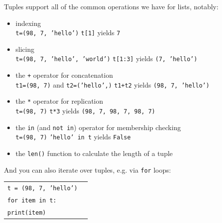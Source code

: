 \documentclass[t,handout,9pt]{beamer}
\begin{document}
\begin{frame}
\vfill
Tuples support all of the common operations we have for lists, notably:
\begin{itemize}
	\item indexing\\
	\quad\texttt{t=(98, 7, 'hello')} \qquad \texttt{t[1]} yields \texttt{7} \\
	\item slicing\\
	\quad\texttt{t=(98, 7, 'hello', 'world')} \qquad \texttt{t[1:3]} yields \texttt{(7, 'hello')} \\
	\item the \texttt{+} operator for concatenation\\
	\quad\texttt{t1=(98, 7)} and \texttt{t2=('hello',)} \qquad \texttt{t1+t2} yields \texttt{(98, 7, 'hello')} \\
	\item the \texttt{*} operator for replication\\
	\quad\texttt{t=(98, 7)} \qquad \texttt{t*3} yields \texttt{(98, 7, 98, 7, 98, 7)} \\
	\item the \texttt{in} (and \texttt{not in}) operator for membership checking\\
	\quad\texttt{t=(98, 7)} \qquad \texttt{'hello' in t} yields \texttt{False} \\
	\item the \texttt{len()} function to calculate the length of a tuple
\end{itemize}
\vfill
And you can also iterate over tuples, e.g. via \texttt{for} loops:
\begin{table}[]
\begin{flushleft}
\begin{tabular}{ll}
\texttt{t = (98, 7, 'hello')} & \\
\texttt{for item in t:} & \\
\texttt{\qquad print(item)} & \\
\end{tabular}
\end{flushleft}
\end{table}
\vfill
\end{frame}
%
\end{document}
